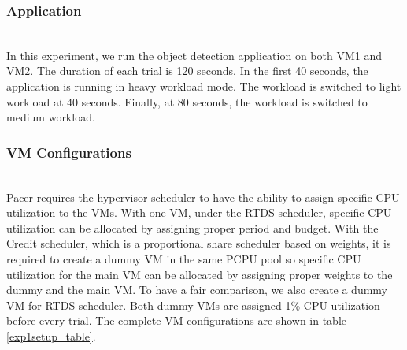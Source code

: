 \subsubsection*{Application}\hfill\\
\indent In this experiment, we run the object detection application on both VM1 and VM2. The duration of each trial is 120 seconds. In the first 40 seconds, the application is running in heavy workload mode. The workload is switched to light workload at 40 seconds. Finally, at 80 seconds, the workload is switched to medium workload.




\subsubsection*{VM Configurations}\hfill\\
\indent Pacer requires the hypervisor scheduler to have the ability to assign specific CPU utilization to the VMs. With one VM, under the RTDS scheduler, specific CPU utilization can be allocated by assigning proper period and budget. With the Credit scheduler, which is a proportional share scheduler based on weights, it is required to create a dummy VM in the same PCPU pool so specific CPU utilization for the main VM can be allocated by assigning proper weights to the dummy and the main VM. To have a fair comparison, we also create a dummy VM for RTDS scheduler. Both dummy VMs are assigned 1\% CPU utilization before every trial. The complete VM configurations are shown in table \ref{exp1setup_table}.



